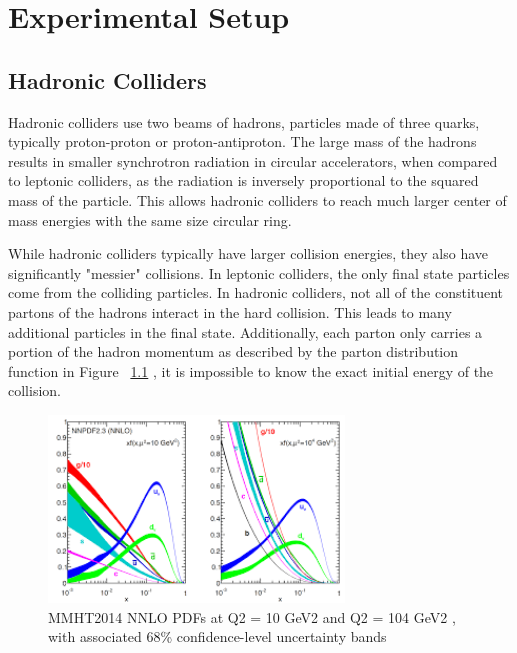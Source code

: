 \chapter{Experimental Setup}
\section{Hadronic Colliders}
Hadronic colliders use two beams of hadrons, particles made of three quarks, typically proton-proton or proton-antiproton. The large mass of the hadrons results in smaller synchrotron radiation in circular accelerators, when compared to leptonic colliders, as the radiation is inversely proportional to the squared mass of the particle. This allows hadronic colliders to reach much larger center of mass energies with the same size circular ring. \newline

\indent While hadronic colliders typically have larger collision energies, they also have significantly "messier" collisions. In leptonic colliders, the only final state particles come from the colliding particles. In hadronic colliders, not all of the constituent partons of the hadrons interact in the hard collision. This leads to many additional particles in the final state. Additionally, each parton only carries a portion of the hadron momentum as described by the parton distribution  function in Figure ~\ref{fig:pdf} , it is impossible to know the exact initial energy of the collision. 

\begin{figure}[h]
\begin{center}
\includegraphics*[width=0.70\textwidth] {figures/pdf}
\caption[MMHT2014 NNLO PDFs at Q2 = 10 GeV2
and Q2 = 104 GeV2
, with associated 68\%
confidence-level uncertainty bands \cite{Harland-Lang:2014zoa}]{MMHT2014 NNLO PDFs at Q2 = 10 GeV2
and Q2 = 104 GeV2
, with associated 68\%
confidence-level uncertainty bands \cite{Harland-Lang:2014zoa}}
\label{fig:pdf}
\end{center}
\end{figure}



